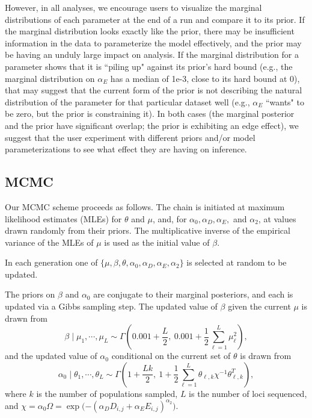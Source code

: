 However, in all analyses, we encourage users to visualize the marginal distributions of each parameter at the end of a run and compare it to its prior.  If the marginal distribution looks exactly like the prior, there may be insufficient information in the data to parameterize the model effectively, and the prior may be having an unduly large impact on analysis.  If the marginal distribution for a parameter shows that it is ``piling up" against its prior's hard bound (e.g., the marginal distribution on $\alpha_E$ has a median of 1e-3, close to its hard bound at 0), that may suggest that the current form of the prior is not describing the natural distribution of the parameter for that particular dataset well (e.g., $\alpha_E$ ``wants" to be zero, but the prior is constraining it).  In both cases (the marginal posterior and the prior have significant overlap; the prior is exhibiting an edge effect), we suggest that the user experiment with different priors and/or model parameterizations to see what effect they are having on inference.

\subsection*{MCMC}
Our MCMC scheme proceeds as follows.  The chain is initiated at maximum likelihood estimates (MLEs) for $\theta$ and $\mu$, and, for  $\alpha_{0},\alpha_{D},\alpha_{E},$ and $\alpha_{2}$, at values drawn randomly from their priors.  The multiplicative inverse of the empirical variance of the MLEs of $\mu$ is used as the initial value of $\beta$.

In each generation one of $\{\mu,\beta,\theta,\alpha_{0},\alpha_{D},\alpha_{E},\alpha_{2}\}$ is selected at random to be updated. 

The priors on $\beta$ and $\alpha_{0}$ are conjugate to their marginal posteriors, and each is updated via a Gibbs sampling step.  The updated value of $\beta$ given the current $\mu$ is drawn from 
\begin{equation}
\beta \; | \; \mu_{1},\cdots,\mu_{L}  \sim \Gamma \left(0.001+\frac{L}{2},~0.001+\frac{1}{2}\sum\limits_{\ell=1}^{L}\mu_{\ell}^2 \right),
\end{equation}
and the updated value of $\alpha_{0}$ conditional on the current set of $\theta$ is drawn from 
\begin{equation}
\alpha_0 \; | \; \theta_{1},\cdots,\theta_{L} \sim \Gamma \left(1+\frac{Lk}{2}, ~1+\frac{1}{2}\sum\limits_{\ell=1}^{L}\theta_{\ell,k}\chi^{-1}\theta_{\ell,k}^{T} \right),
\end{equation}
where $k$ is the number of populations sampled, $L$ is the number of loci sequenced, and $\chi = \alpha_{0}\Omega = \exp{(-(\alpha_{D}D_{i,j}+\alpha_{E}E_{i,j})^{\alpha_{2}}})$.

